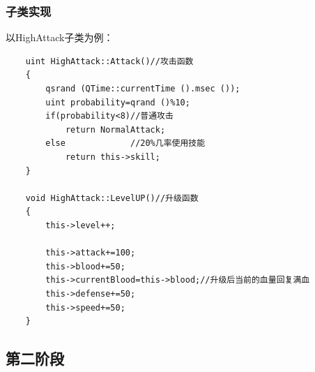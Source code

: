 \documentclass{ctexart}
\begin{document}
\subsubsection{子类实现}
以HighAttack子类为例：
\lstset{language=C++}
\begin{lstlisting}
    uint HighAttack::Attack()//攻击函数
    {
        qsrand (QTime::currentTime ().msec ());
        uint probability=qrand ()%10;
        if(probability<8)//普通攻击
            return NormalAttack;
        else             //20%几率使用技能
            return this->skill;
    }

    void HighAttack::LevelUP()//升级函数
    {
        this->level++;

        this->attack+=100;
        this->blood+=50;
        this->currentBlood=this->blood;//升级后当前的血量回复满血
        this->defense+=50;
        this->speed+=50;
    }
\end{lstlisting}

\subsection{第二阶段}
\end{document}

